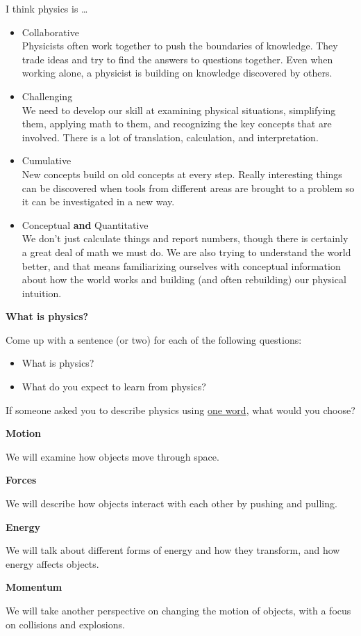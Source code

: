 \documentclass[]{article}
\begin{document}
\begin{TeacherMargin}
\noindent I think physics is \dots
\begin{itemize}
	\item Collaborative \\ Physicists often work together to push the boundaries of knowledge. They trade ideas and try to find the answers to questions together. Even when working alone, a physicist is building on knowledge discovered by others.
	\item Challenging \\ We need to develop our skill at examining physical situations, simplifying them, applying math to them, and recognizing the key concepts that are involved. There is a lot of translation, calculation, and interpretation.
	\item Cumulative \\ New concepts build on old concepts at every step. Really interesting things can be discovered when tools from different areas are brought to a problem so it can be investigated in a new way.
	\item Conceptual \textbf{and} Quantitative \\ We don't just calculate things and report numbers, though there is certainly a great deal of math we must do. We are also trying to understand the world better, and that means familiarizing ourselves with conceptual information about how the world works and building (and often rebuilding) our physical intuition.
\end{itemize}
\end{TeacherMargin}
\begin{PresentSpace}
\begin{center}
	\textbf{What is physics?}
\end{center}
Come up with a sentence (or two) for each of the following questions:
\begin{itemize}
	\item What is physics?
	\item What do you expect to learn from physics?
\end{itemize}
If someone asked you to describe physics using \underline{one word}, what would you choose?
\end{PresentSpace}
\newpage
\begin{TeacherMargin}
\noindent\textbf{Motion}

We will examine how objects move through space.

\noindent\textbf{Forces}

We will describe how objects interact with each other by pushing and pulling.

\noindent\textbf{Energy}

We will talk about different forms of energy and how they transform, and how energy affects objects.

\noindent\textbf{Momentum}

We will take another perspective on changing the motion of objects, with a focus on collisions and explosions.

\end{TeacherMargin}
\end{document}
